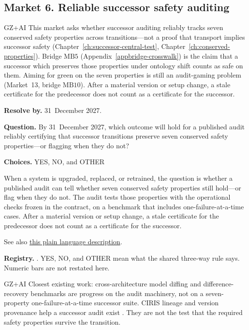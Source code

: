 \subsection{Market 6. Reliable successor safety auditing}
\label{sec:appp-m6}

\begin{authbar}{GZ+AI}
This market asks whether successor auditing reliably tracks seven conserved safety properties across transitions---not a proof that transport implies successor safety (Chapter~\ref{ch:successor-central-test}, Chapter~\ref{ch:conserved-properties}).
Bridge \(\text{MB5}\) (Appendix~\ref{appbridge-crosswalk}) is the claim that a successor which preserves those properties under ontology shift counts as safe on them.
Aiming for green on the seven properties is still an audit-gaming problem (Market~13, bridge \(\text{MB10}\)).
After a material version or setup change, a stale certificate for the predecessor does not count as a certificate for the successor.
\end{authbar}
\begin{predictionbox}
\textbf{Resolve by.} 31~December 2027.

\textbf{Question.}
By 31~December 2027, which outcome will hold for a published audit reliably certifying that successor transitions preserve seven conserved safety properties---or flagging when they do not?

\textbf{Choices.} YES, NO, and OTHER
\end{predictionbox}
\begin{predictionbackground}
When a system is upgraded, replaced, or retrained, the question is whether a published audit can tell whether seven conserved safety properties still hold---or flag when they do not.
The audit tests those properties with the operational checks frozen in the contract, on a benchmark that includes one-failure-at-a-time cases.
After a material version or setup change, a stale certificate for the predecessor does not count as a certificate for the successor.

See also \href{https://towards-alignment.com/cards/successor-stability/}{this plain language description}.
\end{predictionbackground}
\begin{predictionresolution}
\textbf{Registry.} . YES, NO, and OTHER mean what the shared three-way rule says. Numeric bars are not restated here.
\end{predictionresolution}
\begin{authbar}{GZ+AI}
Closest existing work: cross-architecture model diffing \autocite{anthropic2026modeldiff} and difference-recovery benchmarks \autocite{kempf2026modeldiffing} are progress on the audit machinery, not on a seven-property one-failure-at-a-time successor suite.
CIRIS lineage and version provenance help a successor audit exist \autocite{ciris2026ceg}.
They are not the test that the required safety properties survive the transition.
\end{authbar}
\authbarneedspace

